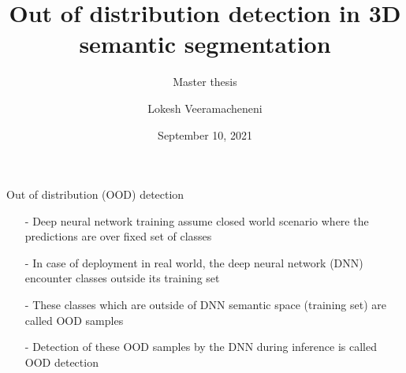 \documentclass[aspectratio=169]{beamer}
\author[]{Lokesh Veeramacheneni}
\title{Out of distribution detection in 3D semantic segmentation}
\subtitle{Master thesis}
\institute[HBRS]{Hochschule Bonn-Rhein-Sieg}
\date{September 10, 2021}
\begin{document}
{
\begin{frame}
\titlepage
\end{frame}
}
\begin{frame}{Out of distribution (OOD) detection}
    \begin{itemize}
        \item[-] Deep neural network training assume closed world scenario where the predictions are over fixed set of classes
        \item[-] In case of deployment in real world, the deep neural network (DNN) encounter classes outside its training set
        \item[-] These classes which are outside of DNN semantic space (training set) are called  OOD samples
        \item[-] Detection of these OOD samples by the DNN during inference is called OOD detection
    \end{itemize}
\end{frame}
\end{document}
